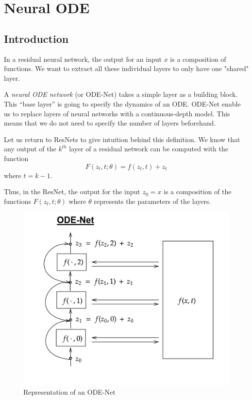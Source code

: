 \documentclass[10pt,a4paper]{article}
\theoremstyle{definition}
\theoremstyle{definition}
\theoremstyle{definition}
\begin{document}
\section{Neural ODE} \label{neuralode}

\subsection{Introduction}

In a residual neural network, the output for an input $x$ is a composition of functions. We want to extract all these individual layers to only have one "shared" layer.

A \textit{neural ODE network} (or ODE-Net) \cite{1,2,3,6} takes a simple layer as a building block. This “base layer” is going to specify the dynamics of an ODE.
ODE-Net enable us to replace layers of neural networks with a continuous-depth model. This means that we do not need to specify the number of layers beforehand.

Let us return to ResNets to give intuition behind this definition. We know that any output of the $k^{th}$ layer of a residual network can be computed with the function
\begin{equation*}
F(z_t, t; \theta) = f(z_t, t) + z_t
\end{equation*}
where $t = k - 1$.

Thus, in the ResNet, the output for the input $z_0 = x$ is a composition of the functions $F(z_t, t; \theta)$ where $\theta$ represents the parameters of the layers.


\begin{figure}
\center
\includegraphics[scale=0.18]{ODENet.png}
\caption{Representation of an ODE-Net}
\end{figure}
\end{document}
